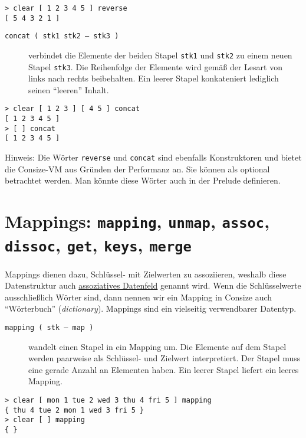 \begin{verbatim}
> clear [ 1 2 3 4 5 ] reverse
[ 5 4 3 2 1 ]
\end{verbatim}

\begin{description}
\item[\texttt{concat ( stk1 stk2 -- stk3 )}] verbindet die Elemente der beiden Stapel \verb|stk1| und \verb|stk2| zu einem neuen Stapel \verb|stk3|. Die Reihenfolge der Elemente wird gemäß der Lesart von links nach rechts beibehalten. Ein leerer Stapel konkateniert lediglich seinen "`leeren"' Inhalt.
\end{description}

\begin{verbatim}
> clear [ 1 2 3 ] [ 4 5 ] concat
[ 1 2 3 4 5 ]
> [ ] concat
[ 1 2 3 4 5 ]
\end{verbatim}

Hinweis: Die Wörter \verb|reverse| und \verb|concat| sind ebenfalls Konstruktoren und bietet die Consize-VM aus Gründen der Performanz an. Sie können als optional betrachtet werden. Man könnte diese Wörter auch in der Prelude definieren.


\section{Mappings: \texttt{mapping}, \texttt{unmap}, \texttt{assoc}, \texttt{dissoc}, \texttt{get}, \texttt{keys}, \texttt{merge}}

Mappings dienen dazu, Schlüssel- mit Zielwerten zu assoziieren, weshalb diese Datenstruktur auch \href{http://de.wikipedia.org/wiki/Assoziatives_Datenfeld}{assoziatives Datenfeld} genannt wird. Wenn die Schlüsselwerte ausschließlich Wörter sind, dann nennen wir ein Mapping in Consize auch "`Wörterbuch"' (\emph{dictionary}). Mappings sind ein vielseitig verwendbarer Datentyp.

\begin{description}
\item[\texttt{mapping ( stk -- map )}] wandelt einen Stapel in ein Mapping um. Die Elemente auf dem Stapel werden paarweise als Schlüssel- und Zielwert interpretiert. Der Stapel muss eine gerade Anzahl an Elementen haben. Ein leerer Stapel liefert ein leeres Mapping.
\end{description}

\begin{verbatim}
> clear [ mon 1 tue 2 wed 3 thu 4 fri 5 ] mapping
{ thu 4 tue 2 mon 1 wed 3 fri 5 }
> clear [ ] mapping
{ }
\end{verbatim}

